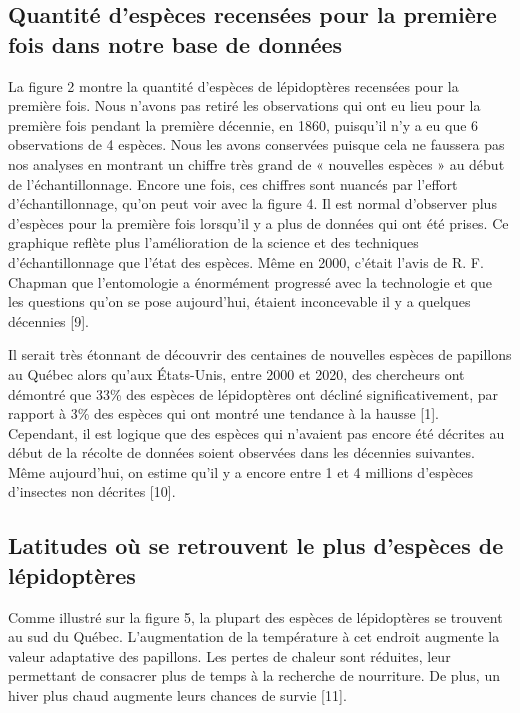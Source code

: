 \documentclass[preprint, 3p,
authoryear]{elsarticle} %
\begin{document}
\subsection{Quantité d'espèces recensées pour la première fois dans
notre base de
données}\label{quantituxe9-despuxe8ces-recensuxe9es-pour-la-premiuxe8re-fois-dans-notre-base-de-donnuxe9es}

La figure 2 montre la quantité d'espèces de lépidoptères recensées pour
la première fois. Nous n'avons pas retiré les observations qui ont eu
lieu pour la première fois pendant la première décennie, en 1860,
puisqu'il n'y a eu que 6 observations de 4 espèces. Nous les avons
conservées puisque cela ne faussera pas nos analyses en montrant un
chiffre très grand de « nouvelles espèces » au début de
l'échantillonnage. Encore une fois, ces chiffres sont nuancés par
l'effort d'échantillonnage, qu'on peut voir avec la figure 4. Il est
normal d'observer plus d'espèces pour la première fois lorsqu'il y a
plus de données qui ont été prises. Ce graphique reflète plus
l'amélioration de la science et des techniques d'échantillonnage que
l'état des espèces. Même en 2000, c'était l'avis de R. F. Chapman que
l'entomologie a énormément progressé avec la technologie et que les
questions qu'on se pose aujourd'hui, étaient inconcevable il y a
quelques décennies {[}9{]}.

Il serait très étonnant de découvrir des centaines de nouvelles espèces
de papillons au Québec alors qu'aux États-Unis, entre 2000 et 2020, des
chercheurs ont démontré que 33\% des espèces de lépidoptères ont décliné
significativement, par rapport à 3\% des espèces qui ont montré une
tendance à la hausse {[}1{]}. Cependant, il est logique que des espèces
qui n'avaient pas encore été décrites au début de la récolte de données
soient observées dans les décennies suivantes. Même aujourd'hui, on
estime qu'il y a encore entre 1 et 4 millions d'espèces d'insectes non
décrites {[}10{]}.

\subsection{Latitudes où se retrouvent le plus d'espèces de
lépidoptères}\label{latitudes-ouxf9-se-retrouvent-le-plus-despuxe8ces-de-luxe9pidoptuxe8res}

Comme illustré sur la figure 5, la plupart des espèces de lépidoptères
se trouvent au sud du Québec. L'augmentation de la température à cet
endroit augmente la valeur adaptative des papillons. Les pertes de
chaleur sont réduites, leur permettant de consacrer plus de temps à la
recherche de nourriture. De plus, un hiver plus chaud augmente leurs
chances de survie {[}11{]}.
\end{document}
